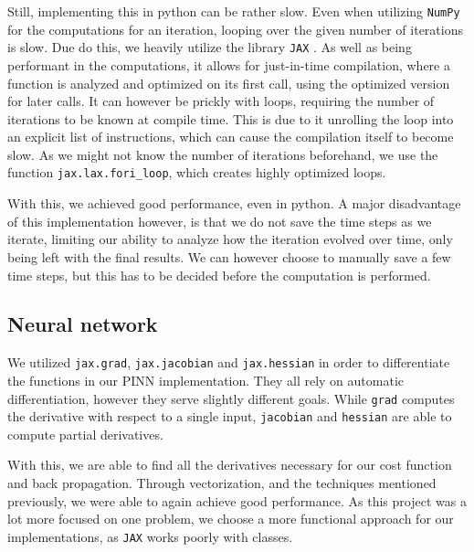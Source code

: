 \documentclass{article}
\theoremstyle{definition}
\begin{document}
Still, implementing this in python can be rather slow. Even when utilizing \verb|NumPy| for the computations for an iteration, looping over the given number of iterations is slow. Due do this, we heavily utilize the library \verb|JAX| \parencite{jax2018github}. As well as being performant in the computations, it allows for just-in-time compilation, where a function is analyzed and optimized on its first call, using the optimized version for later calls. It can however be prickly with loops, requiring the number of iterations to be known at compile time. This is due to it unrolling the loop into an explicit list of instructions, which can cause the compilation itself to become slow. As we might not know the number of iterations beforehand, we use the function \verb|jax.lax.fori_loop|, which creates highly optimized loops.



With this, we achieved good performance, even in python. A major disadvantage of this implementation however, is that we do not save the time steps as we iterate, limiting our ability to analyze how the iteration evolved over time, only being left with the final results. We can however choose to manually save a few time steps, but this has to be decided before the computation is performed.

\subsection{Neural network}
We utilized \verb|jax.grad|, \verb|jax.jacobian| and \verb|jax.hessian| in order to differentiate the functions in our PINN implementation. They all rely on automatic differentiation, however they serve slightly different goals. While \verb|grad| computes the derivative with respect to a single input, \verb|jacobian| and \verb|hessian| are able to compute partial derivatives.

With this, we are able to find all the derivatives necessary for our cost function and back propagation. Through vectorization, and the techniques mentioned previously, we were able to again achieve good performance. As this project was a lot more focused on one problem, we choose a more functional approach for our implementations, as \verb|JAX| works poorly with classes.
\end{document}
